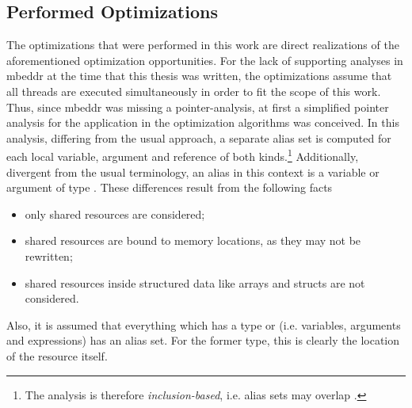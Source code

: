 \subsection{Performed Optimizations}
The optimizations that were performed in this work are direct realizations of the aforementioned optimization opportunities. For the lack of supporting analyses in mbeddr at the time that this thesis was written, the optimizations assume that all threads are executed simultaneously in order to fit the scope of this work. Thus, since mbeddr was missing a pointer-analysis, at first a simplified pointer analysis for the application in the optimization algorithms was conceived. In this analysis, differing from the usual approach, a separate alias set is computed for each local variable, argument and reference of both kinds.\footnote{The analysis is therefore \textit{inclusion-based}, i.e. alias sets may overlap \cite{CloningBasedContextSensitive}.} Additionally, divergent from the usual terminology, an alias in this context is a variable or argument of type . These differences result from the following facts
\begin{itemize}
\item only shared resources are considered;
\item shared resources are bound to memory locations, as they may not be rewritten;
\item shared resources inside structured data like arrays and structs are not considered.
\end{itemize}

Also, it is assumed that everything which has a type  or  (i.e. variables, arguments and expressions) has an alias set. For the former type, this is clearly the location of the resource itself.

